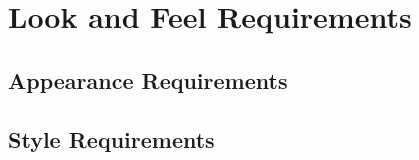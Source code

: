 \section{Look and Feel Requirements}
\subsection{Appearance Requirements}
\subsection{Style Requirements}
